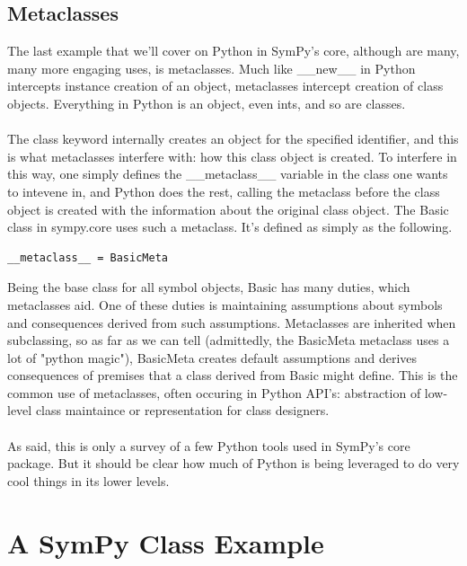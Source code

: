 \documentclass[11pt,a4paper,oneside]{report}
\begin{document}
\subsection*{Metaclasses}
The last example that we'll cover on Python in SymPy's core, although are many, many more engaging uses, is metaclasses. Much like \_\_new\_\_ in Python intercepts instance creation of an object, metaclasses intercept creation of class objects. Everything in Python is an object, even ints, and so are classes.\\\\
 The class keyword internally creates an object for the specified identifier, and this is what metaclasses interfere with: how this class object is created. To interfere in this way, one simply defines the \_\_metaclass\_\_ variable in the class one wants to intevene in, and Python does the rest, calling the metaclass before the class object is created with the information about the original class object. The Basic class in sympy.core uses such a metaclass. It's defined as simply as the following.
\begin{verbatim}
__metaclass__ = BasicMeta
\end{verbatim}
Being the base class for all symbol objects, Basic has many duties, which metaclasses aid. One of these duties is maintaining assumptions about symbols and consequences derived from such assumptions. Metaclasses are inherited when subclassing, so as far as we can tell (admittedly, the BasicMeta metaclass uses a lot of "python magic"), BasicMeta creates default assumptions and derives consequences of premises that a class derived from Basic might define. This is the common use of metaclasses, often occuring in Python API's: abstraction of low-level class maintaince or representation for class designers.\\\\
As said, this is only a survey of a few Python tools used in SymPy's core package. But it should be clear how much of Python is being leveraged to do very cool things in its lower levels.
\section*{A SymPy Class Example}
\end{document}
